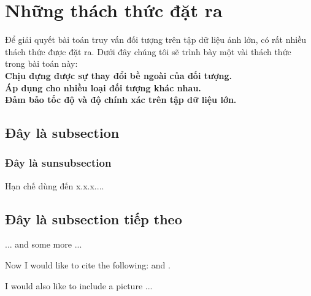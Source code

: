 \section{Những thách thức đặt ra}
 Để giải quyết bài toán truy vấn đối tượng trên tập dữ liệu ảnh lớn, có rất nhiều thách thức được đặt ra. Dưới đây chúng tôi sẽ trình bày một vài thách thức trong bài toán này:\\
 \textbf{Chịu đựng được sự thay đổi bề ngoài của đối tượng.}\\
 \textbf{Áp dụng cho nhiều loại đối tượng khác nhau.}\\
 \textbf{Đảm bảo tốc độ và độ chính xác trên tập dữ liệu lớn.}\\

\subsection{Đây là subsection }
\subsubsection{Đây là sunsubsection }
 
Hạn chế dùng đến x.x.x.... 
\subsection{Đây là subsection tiếp theo}
... and some more ...

Now I would like to cite the following: 
and \cite{Rud73}.

I would also like to include a picture ...

